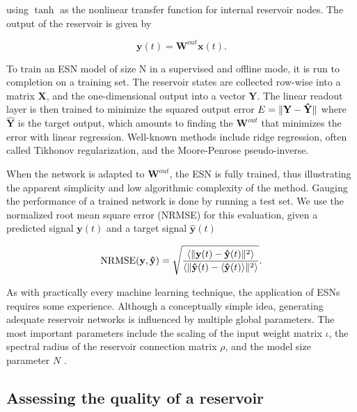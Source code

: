 \noindent using $\tanh$ as the nonlinear transfer function for internal
reservoir nodes. The output of the reservoir is given by

\begin{equation}
  \mathbf{y}(t) =
    \mathbf{W}^{out}\mathbf{x}(t).
  \label{yt}
\end{equation}

To train an ESN model of size N in a supervised and offline mode, it is run to
completion on a training set. The reservoir states are collected row-wise into a
matrix $\mathbf{X}$, and the one-dimensional output into a vector
$\mathbf{Y}$. The linear readout layer is then trained to minimize the squared
output error $E = \Vert \mathbf{Y} - \mathbf{\hat{Y}} \Vert$ where $\mathbf{\hat{Y}}$
is the target output, which amounts to finding the $\mathbf{W}^{out}$ that
minimizes the error with linear regression. Well-known methods include ridge
regression, often called Tikhonov regularization, and the Moore-Penrose
pseudo-inverse.

When the network is adapted to $\mathbf{W}^{out}$, the ESN is fully trained,
thus illustrating the apparent simplicity and low algorithmic complexity of the
method. Gauging the performance of a trained network is done by running a test
set. We use the normalized root mean square error (NRMSE) for this evaluation,
given a predicted signal $\mathbf{y}(t)$ and a target signal
$\mathbf{\hat{y}}(t)$

\begin{equation}
  \textrm{NRMSE}(\mathbf{y}, \mathbf{\hat{y}}) = \sqrt{\frac{
      \langle\Vert \mathbf{y}(t) - \mathbf{\hat{y}}(t) \Vert^{2}\rangle
    }{
      \langle\Vert \mathbf{\hat{y}}(t) - \langle\mathbf{\hat{y}}(t)\rangle \Vert^{2}\rangle
    }
  }
  .
  \label{nrmse}
\end{equation}

As with practically every machine learning technique, the application of ESNs
requires some experience. Although a conceptually simple idea, generating
adequate reservoir networks is influenced by multiple global parameters. The
most important parameters include the scaling of the input weight matrix
$\iota$, the spectral radius of the reservoir connection matrix $\rho$, and the
model size parameter $N$ \cite{montavon_practical_2012, jaeger_tutorial_nodate}.

\subsection{Assessing the quality of a reservoir}

